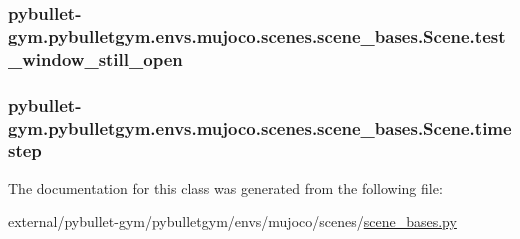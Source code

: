 \subsubsection[{\texorpdfstring{test\+\_\+window\+\_\+still\+\_\+open}{test_window_still_open}}]{\setlength{\rightskip}{0pt plus 5cm}pybullet-\/gym.\+pybulletgym.\+envs.\+mujoco.\+scenes.\+scene\+\_\+bases.\+Scene.\+test\+\_\+window\+\_\+still\+\_\+open}\hypertarget{classpybullet-gym_1_1pybulletgym_1_1envs_1_1mujoco_1_1scenes_1_1scene__bases_1_1_scene_a468baab9f47e92103bf34f1b86798996}{}\label{classpybullet-gym_1_1pybulletgym_1_1envs_1_1mujoco_1_1scenes_1_1scene__bases_1_1_scene_a468baab9f47e92103bf34f1b86798996}
\subsubsection[{\texorpdfstring{timestep}{timestep}}]{\setlength{\rightskip}{0pt plus 5cm}pybullet-\/gym.\+pybulletgym.\+envs.\+mujoco.\+scenes.\+scene\+\_\+bases.\+Scene.\+timestep}\hypertarget{classpybullet-gym_1_1pybulletgym_1_1envs_1_1mujoco_1_1scenes_1_1scene__bases_1_1_scene_a29de076e83c72d0aafa872cd87253525}{}\label{classpybullet-gym_1_1pybulletgym_1_1envs_1_1mujoco_1_1scenes_1_1scene__bases_1_1_scene_a29de076e83c72d0aafa872cd87253525}


The documentation for this class was generated from the following file\+:\begin{DoxyCompactItemize}
\item 
external/pybullet-\/gym/pybulletgym/envs/mujoco/scenes/\hyperlink{mujoco_2scenes_2scene__bases_8py}{scene\+\_\+bases.\+py}\end{DoxyCompactItemize}
